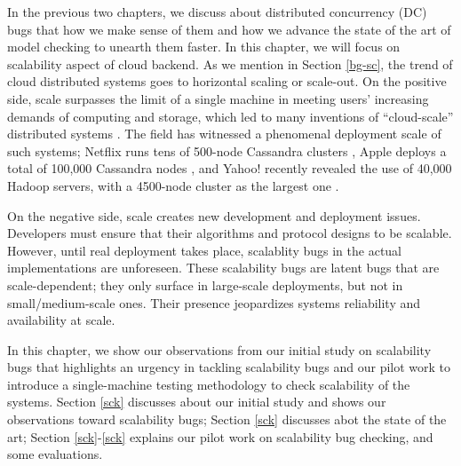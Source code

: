 
In the previous two chapters, we discuss about distributed concurrency (DC) bugs
that how we make sense of them and how we advance the state of the art of model
checking to unearth them faster. In this chapter, we will focus on
scalability aspect of cloud backend. As we mention in Section \ref{bg-sc}, the
trend of cloud distributed systems goes to horizontal scaling or scale-out.
On the positive side, scale surpasses the limit of a single machine in
meeting users' increasing demands of computing and storage, which led to
many inventions of ``cloud-scale'' distributed systems
\cite{Chang+06-BigTable, 
DeanGhemawat04-MapReduce, 
DeCandia+07-Dynamo,
Ghemawat+03-GoogleFS, 
Hindman+11-Mesos,
Verma+15-Borg}. The field has witnessed a
phenomenal deployment scale of such systems;
%
Netflix runs tens of 500-node Cassandra clusters \cite{RunningNetflix13},
Apple deploys a total of 100,000 Cassandra nodes \cite{WikiCassandra}, 
and Yahoo! recently revealed the use of 40,000 Hadoop servers,
with a 4500-node cluster as the largest one \cite{LargestHadoop}.

On the negative side, scale creates new development and deployment issues.
Developers must ensure that their algorithms and protocol designs to be
scalable.  However, until real deployment takes place, scalablity bugs in the
actual implementations are unforeseen.
These scalability bugs are latent bugs that are scale-dependent; they only
surface in large-scale deployments, but not in small/medium-scale ones. Their
presence jeopardizes systems reliability and availability at scale.

In this chapter, we show our observations from our initial study on scalability
bugs that highlights an urgency in tackling scalability bugs and our pilot work
to introduce a single-machine testing methodology to check scalability of the
systems. Section \ref{sck} discusses about our initial study and shows our
observations toward scalability bugs; Section \ref{sck} discusses abot the state
of the art; Section \ref{sck}-\ref{sck} explains our pilot work on scalability
bug checking, \sck and some evaluations.


